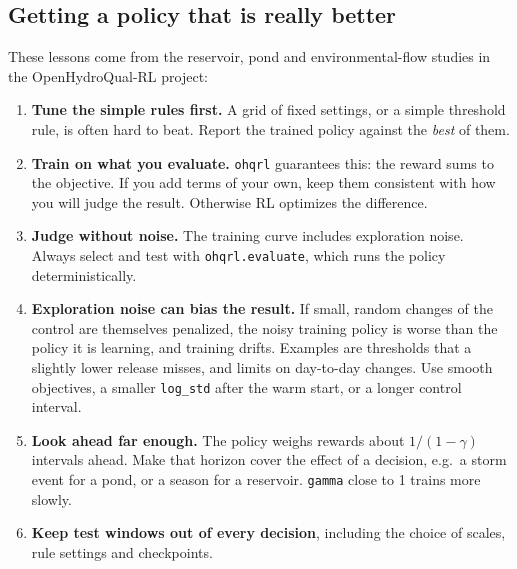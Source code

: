 \documentclass[11pt]{article}
\newcommand{\code}[1]{\texttt{#1}}
\begin{document}
\subsection{Getting a policy that is really better}
These lessons come from the reservoir, pond and environmental-flow studies
in the OpenHydroQual-RL project:
\begin{enumerate}
\item \textbf{Tune the simple rules first.} A grid of fixed settings, or a
  simple threshold rule, is often hard to beat. Report the trained policy
  against the \emph{best} of them.
\item \textbf{Train on what you evaluate.} \code{ohqrl} guarantees this:
  the reward sums to the objective. If you add terms of your own, keep them
  consistent with how you will judge the result. Otherwise RL optimizes the
  difference.
\item \textbf{Judge without noise.} The training curve includes exploration
  noise. Always select and test with \code{ohqrl.evaluate}, which runs the
  policy deterministically.
\item \textbf{Exploration noise can bias the result.} If small, random
  changes of the control are themselves penalized, the noisy training
  policy is worse than the policy it is learning, and training drifts.
  Examples are thresholds that a slightly lower release misses, and limits
  on day-to-day changes. Use smooth objectives, a smaller \code{log\_std}
  after the warm start, or a longer control interval.
\item \textbf{Look ahead far enough.} The policy weighs rewards about
  $1/(1-\gamma)$ intervals ahead. Make that horizon cover the effect of a
  decision, e.g.\ a storm event for a pond, or a season for a reservoir.
  \code{gamma} close to 1 trains more slowly.
\item \textbf{Keep test windows out of every decision}, including the
  choice of scales, rule settings and checkpoints.
\end{enumerate}
\end{document}
